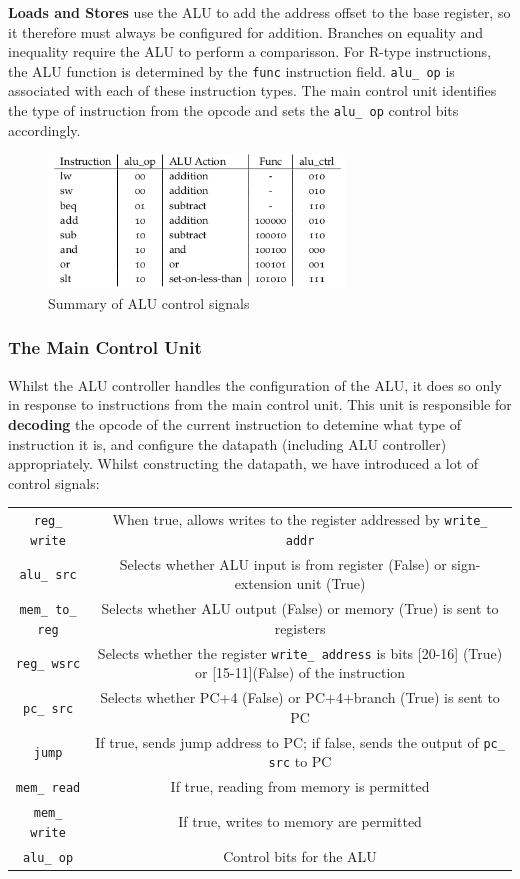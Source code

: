 \documentclass{article}
\begin{document}
	\par
	\textbf{Loads and Stores} use the ALU to add the address offset to the base register, so it therefore must always be configured for addition. Branches on equality and inequality require the ALU to perform a comparisson. For R-type instructions, the ALU function is determined by the \texttt{func} instruction field. \texttt{alu\_ op} is associated with each of these instruction types. The main control unit identifies the type of instruction from the opcode and sets the \texttt{alu\_ op} control bits accordingly.
	
	\begin{figure}[ht]
		\centering
		\includegraphics[width=0.7\textwidth]{alu_control_signals}
		\caption{Summary of ALU control signals}
		\label{fig:alu control signals}
	\end{figure}
	
	\subsubsection{The Main Control Unit}
	Whilst the ALU controller handles the configuration of the ALU, it does so only in response to instructions from the main control unit. This unit is responsible for \textbf{decoding} the opcode of the current instruction to detemine what type of instruction it is, and configure the datapath (including ALU controller) appropriately. Whilst constructing the datapath, we have introduced a lot of control signals:
	
	\begin{tabular}{c|c}
	\texttt{reg\_ write} & When true, allows writes to the register addressed by \texttt{write\_ addr} \\
	\texttt{alu\_ src} & Selects whether ALU input is from register (False) or sign-extension unit (True) \\
	\texttt{mem\_ to\_ reg} & Selects whether ALU output (False) or memory (True) is sent to registers \\
	\texttt{reg\_ wsrc} & Selects whether the register \texttt{write\_ address} is bits [20-16] (True) or [15-11](False) of the instruction \\
	\texttt{pc\_ src} & Selects whether PC+4 (False) or PC+4+branch (True) is sent to PC \\
	\texttt{jump} & If true, sends jump address to PC; if false, sends the output of \texttt{pc\_ src} to PC \\
	\texttt{mem\_ read} & If true, reading from memory is permitted \\
	\texttt{mem\_ write} & If true, writes to memory are permitted \\
	\texttt{alu\_ op} & Control bits for the ALU
	\end{tabular}
	
\end{document}

